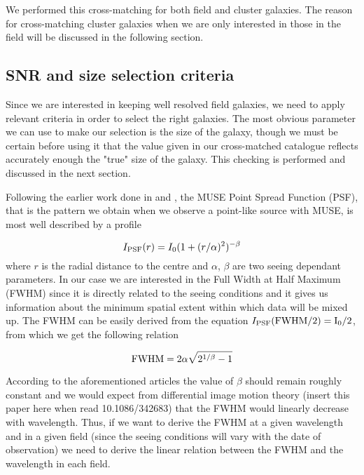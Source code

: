 We performed this cross-matching for both field and cluster galaxies. The reason for cross-matching cluster galaxies when we are only interested in those in the field will be discussed in the following section.

\subsection{SNR and size selection criteria}

Since we are interested in keeping well resolved field galaxies, we need to apply relevant criteria in order to select the right galaxies. The most obvious parameter we can use to make our selection is the size of the galaxy, though we must be certain before using it that the value given in our cross-matched catalogue reflects accurately enough the "true" size of the galaxy. This checking is performed and discussed in the next section.

Following the earlier work done in  and , the MUSE Point Spread Function (PSF), that is the pattern we obtain when we observe a point-like source with MUSE, is most well described by a  profile

\begin{equation}
	I_{\rm{PSF}}(r) = I_0 (1 + (r/\alpha)^2 ) ^{- \beta}
\end{equation}
where $r$ is the radial distance to the centre and $\alpha$, $\beta$ are two seeing dependant parameters. In our case we are interested in the Full Width at Half Maximum (FWHM) since it is directly related to the seeing conditions and it gives us information about the minimum spatial extent within which data will be mixed up.
The FWHM can be easily derived from the equation $I_{\rm{PSF}} ( \rm{FWHM}/2) = I_0 /2$, from which we get the following relation

\begin{equation}
	\rm{FWHM} = 2 \alpha \sqrt{2^{1/\beta} - 1 }
\end{equation}

According to the aforementioned articles the value of $\beta$ should remain roughly constant and we would expect from differential image motion theory (insert this paper here when read 10.1086/342683) that the FWHM  would linearly decrease with wavelength. Thus, if we want to derive the FWHM at a given wavelength and in a given field (since the seeing conditions will vary with the date of observation) we need to derive the linear relation between the FWHM and the wavelength in each field.

